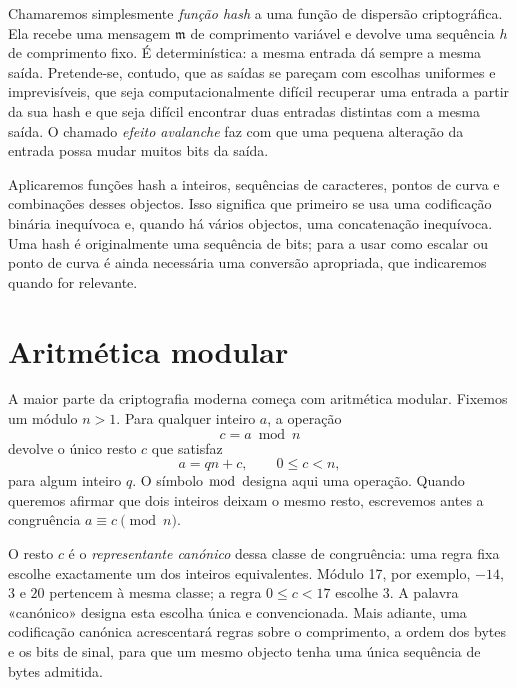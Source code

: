 Chamaremos simplesmente {\em função hash} a uma função de dispersão
criptográfica.
 Ela recebe uma mensagem \(\mathfrak{m}\) de comprimento variável
e devolve uma sequência \(h\) de comprimento fixo. É determinística: a mesma
entrada dá sempre a mesma saída. Pretende-se, contudo, que as saídas se pareçam
com escolhas uniformes e imprevisíveis, que seja computacionalmente difícil
recuperar uma entrada a partir da sua hash e que seja difícil encontrar duas
entradas distintas com a mesma saída. O chamado {\em efeito avalanche} faz com
que uma pequena alteração da entrada possa mudar muitos bits da saída.

Aplicaremos funções hash a inteiros, sequências de caracteres, pontos de curva
e combinações desses objectos. Isso significa que primeiro se usa uma
codificação binária inequívoca e, quando há vários objectos, uma concatenação
inequívoca. Uma hash é originalmente uma sequência de bits; para a usar como
escalar ou ponto de curva é ainda necessária uma conversão apropriada, que
indicaremos quando for relevante.

\section{Aritmética modular}
\label{sec:modular-arithmetic}

A maior parte da criptografia moderna começa com aritmética modular. Fixemos
um módulo \(n>1\). Para qualquer inteiro \(a\), a operação
\[
c=a\bmod n
\]
devolve o único resto \(c\) que satisfaz
\[
a=qn+c,\qquad 0\leq c<n,
\]
para algum inteiro \(q\). O símbolo \(\bmod\) designa aqui uma operação. Quando
queremos afirmar que dois inteiros deixam o mesmo resto, escrevemos antes a
congruência \(a\equiv c\pmod n\).

\label{sec:canonical-representation}
O resto \(c\) é o \emph{representante canónico} dessa classe de congruência:
uma regra fixa escolhe exactamente um dos inteiros equivalentes. Módulo 17,
por exemplo, \(-14\), \(3\) e \(20\) pertencem à mesma classe; a regra
\(0\leq c<17\) escolhe \(3\). A palavra «canónico» designa esta escolha
única e convencionada. Mais adiante, uma codificação canónica acrescentará
regras sobre o comprimento, a ordem dos bytes e os bits de sinal, para que
um mesmo objecto tenha uma única sequência de bytes admitida.

